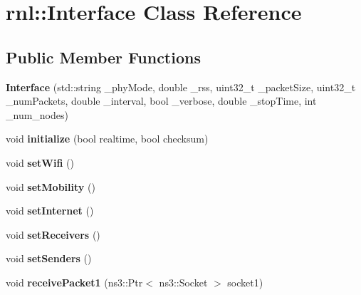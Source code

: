 \hypertarget{classrnl_1_1Interface}{}\section{rnl\+:\+:Interface Class Reference}
\label{classrnl_1_1Interface}
\subsection*{Public Member Functions}
\begin{DoxyCompactItemize}
\item 
\mbox{\label{classrnl_1_1Interface_a4eb31e79f9bf95092728127a2e6038f9}} 
{\bfseries Interface} (std\+::string \+\_\+phy\+Mode, double \+\_\+rss, uint32\+\_\+t \+\_\+packet\+Size, uint32\+\_\+t \+\_\+num\+Packets, double \+\_\+interval, bool \+\_\+verbose, double \+\_\+stop\+Time, int \+\_\+num\+\_\+nodes)
\item 
\mbox{\label{classrnl_1_1Interface_a03437a1f146f72598791f1f2cb2cf572}} 
void {\bfseries initialize} (bool realtime, bool checksum)
\item 
\mbox{\label{classrnl_1_1Interface_a1980d9bc2f9b7dcc467c1978dcadb633}} 
void {\bfseries set\+Wifi} ()
\item 
\mbox{\label{classrnl_1_1Interface_ade69ea8204ee8a1856f1b88d71f5d7bc}} 
void {\bfseries set\+Mobility} ()
\item 
\mbox{\label{classrnl_1_1Interface_a920e906ce049b05a8fdd56170cb7985f}} 
void {\bfseries set\+Internet} ()
\item 
\mbox{\label{classrnl_1_1Interface_a4ca6a5ceb5da7820b60f6f64fc677359}} 
void {\bfseries set\+Receivers} ()
\item 
\mbox{\label{classrnl_1_1Interface_a4eef0d1ba74df30a652c76dcbd533830}} 
void {\bfseries set\+Senders} ()
\item 
\mbox{\label{classrnl_1_1Interface_a52299419f5e100b5395ed93df4fdeb31}} 
void {\bfseries receive\+Packet1} (ns3\+::\+Ptr$<$ ns3\+::\+Socket $>$ socket1)

\end{DoxyCompactItemize}
